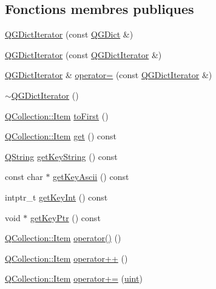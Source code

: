 \subsection*{Fonctions membres publiques}
\begin{DoxyCompactItemize}
\item 
\hyperlink{class_q_g_dict_iterator_ad3a8cee70c155fb51cdb49f4d0200fff}{Q\+G\+Dict\+Iterator} (const \hyperlink{class_q_g_dict}{Q\+G\+Dict} \&)
\item 
\hyperlink{class_q_g_dict_iterator_a877692de8c5afd9fbc1cad31022c6bdc}{Q\+G\+Dict\+Iterator} (const \hyperlink{class_q_g_dict_iterator}{Q\+G\+Dict\+Iterator} \&)
\item 
\hyperlink{class_q_g_dict_iterator}{Q\+G\+Dict\+Iterator} \& \hyperlink{class_q_g_dict_iterator_a4ae06e135ad6a141c8c682051eea4d89}{operator=} (const \hyperlink{class_q_g_dict_iterator}{Q\+G\+Dict\+Iterator} \&)
\item 
\hyperlink{class_q_g_dict_iterator_a82aad9acca4983ae9c42f4ee756558c7}{$\sim$\+Q\+G\+Dict\+Iterator} ()
\item 
\hyperlink{class_q_collection_ac6f3ddbf999e31fb797927f71ae6b5d7}{Q\+Collection\+::\+Item} \hyperlink{class_q_g_dict_iterator_a67e4f848a3e0e4577dd862e410b71d5b}{to\+First} ()
\item 
\hyperlink{class_q_collection_ac6f3ddbf999e31fb797927f71ae6b5d7}{Q\+Collection\+::\+Item} \hyperlink{class_q_g_dict_iterator_a6dcacb12fa9d964ed5ba3c17fb194dfc}{get} () const 
\item 
\hyperlink{class_q_string}{Q\+String} \hyperlink{class_q_g_dict_iterator_af9a4bd4fcdc16e7ef2f215b07b7c7e59}{get\+Key\+String} () const 
\item 
const char $\ast$ \hyperlink{class_q_g_dict_iterator_aba49d47c7ddaf2b40efa071b9a03712e}{get\+Key\+Ascii} () const 
\item 
intptr\+\_\+t \hyperlink{class_q_g_dict_iterator_ac1005f63b163ff0b62159e79f06d1b97}{get\+Key\+Int} () const 
\item 
void $\ast$ \hyperlink{class_q_g_dict_iterator_af2347c20deb8cb712998d18e14247bed}{get\+Key\+Ptr} () const 
\item 
\hyperlink{class_q_collection_ac6f3ddbf999e31fb797927f71ae6b5d7}{Q\+Collection\+::\+Item} \hyperlink{class_q_g_dict_iterator_a3833bbdb7178dbfcbac95547ef4c6bcf}{operator()} ()
\item 
\hyperlink{class_q_collection_ac6f3ddbf999e31fb797927f71ae6b5d7}{Q\+Collection\+::\+Item} \hyperlink{class_q_g_dict_iterator_ab4cdd2c2b2ab8714c8144a5bb54a7409}{operator++} ()
\item 
\hyperlink{class_q_collection_ac6f3ddbf999e31fb797927f71ae6b5d7}{Q\+Collection\+::\+Item} \hyperlink{class_q_g_dict_iterator_a71905aff98dbecf1de97bb164d1b3203}{operator+=} (\hyperlink{qglobal_8h_a4d3943ddea65db7163a58e6c7e8df95a}{uint})
\end{DoxyCompactItemize}
